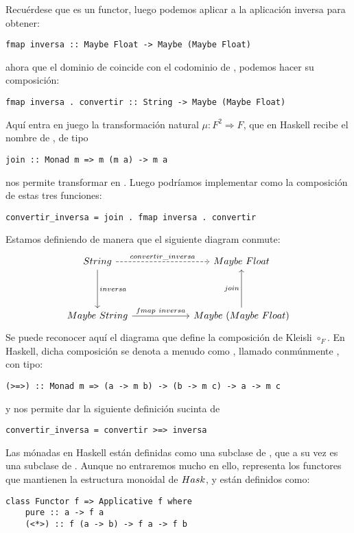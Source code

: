 Recuérdese que  es un functor, luego podemos aplicar  a la aplicación inversa para obtener:
\begin{verbatim}
fmap inversa :: Maybe Float -> Maybe (Maybe Float)
\end{verbatim}
ahora que el dominio de  coincide con el codominio de , podemos hacer su composición:
\begin{verbatim}
fmap inversa . convertir :: String -> Maybe (Maybe Float) 
\end{verbatim}
Aquí entra en juego la transformación natural $\mu \colon F^2 \Rightarrow F$, que en Haskell recibe el nombre de , de tipo 
\begin{verbatim}
join :: Monad m => m (m a) -> m a
\end{verbatim}
 nos permite transformar  en .
Luego podríamos implementar  como la composición de estas tres funciones:
\begin{verbatim}
convertir_inversa = join . fmap inversa . convertir
\end{verbatim}
Estamos definiendo  de manera que el siguiente diagram conmute:
\begin{displaymath}\begin{tikzcd}[column sep=6em,row sep=4em]
{String} \arrow[r,"convertir\_inversa",dashed] \arrow[d,"inversa"]& {Maybe\ Float}\\
{Maybe\ String} \arrow[r,"{fmap\ inversa}"] & {Maybe\ (Maybe\ Float)} \arrow[u,"join"]
\end{tikzcd}\end{displaymath}
Se puede reconocer aquí el diagrama que define la composición de Kleisli $\circ_F$.
En Haskell, dicha composición se denota a menudo como \code{>=>}, llamado conmúnmente , con tipo:
\begin{verbatim}
(>=>) :: Monad m => (a -> m b) -> (b -> m c) -> a -> m c
\end{verbatim}
y nos permite dar la siguiente definición sucinta de 
\begin{verbatim}
convertir_inversa = convertir >=> inversa
\end{verbatim}

Las mónadas en Haskell están definidas como una subclase de , que a su vez es una subclase de .
Aunque no entraremos mucho en ello,  representa los functores que mantienen la estructura monoidal de ${Hask}$, y están definidos como:
\begin{verbatim}
class Functor f => Applicative f where
    pure :: a -> f a
    (<*>) :: f (a -> b) -> f a -> f b
\end{verbatim}

